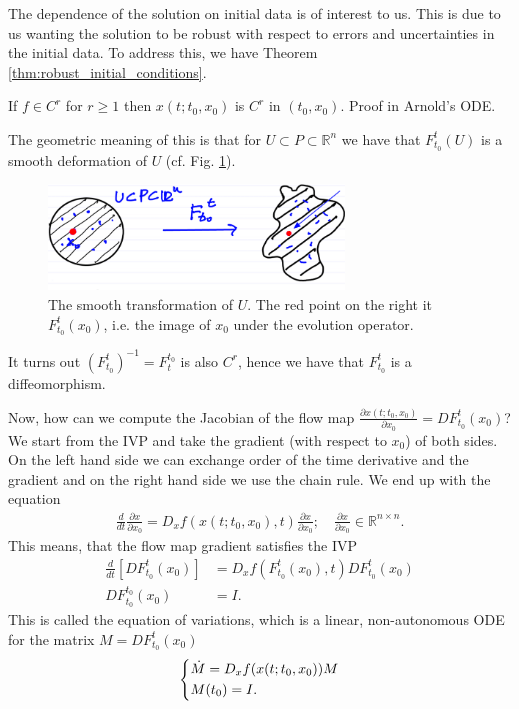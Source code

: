 The dependence of the solution on initial data is of interest to us. This is due to us wanting the solution to be robust with respect to errors and uncertainties in the initial data. To address this, we have Theorem \ref{thm:robust_initial_conditions}.
\begin{theorem}[]
	If $f \in C^r$ for $r\geq 1$ then $ {x}(t; t_0,  {x}_0)$ is $C^r$ in $(t_0,  {x}_0)$. Proof in Arnold's ODE.
	\label{thm:robust_initial_conditions}
\end{theorem}

The geometric meaning of this is that for $U \subset P \subset \mathbb{R}^{n}$ we have that $F_{t_0}^{t}(U)$ is a smooth deformation of $U$ (cf. Fig. \ref{fig:deformation}).
\begin{figure}[h!]
	\centering
	\includegraphics[width=0.7\textwidth]{figures/ch1/7smooth_transform.png}
	\caption{The smooth transformation of $U$. The red point on the right it $F _{t_0}^t( {x}_0)$, i.e. the image of $ {x}_0$ under the evolution operator.}
	\label{fig:deformation}
\end{figure}
It turns out $\left(F_{t_0}^{t}\right)^{-1} = F_{t}^{t_0}$ is also $C^r$, hence we have that $F_{t_0}^{t}$ is a diffeomorphism. 

Now, how can we compute the Jacobian of the flow map $\frac{\partial  {x}(t; t_0,  {x}_0)}{ \partial  {x}_0} = DF _{t_0}^{t}( {x}_0)$? We start from the IVP and take the gradient (with respect to $x_0$) of both sides. On the left hand side we can exchange order of the time derivative and the gradient and on the right hand side we use the chain rule. We end up with the equation
\begin{align}
	\frac{d}{dt}\frac{\partial  {x}}{\partial  {x}_0} = D_ {x} f( {x}(t; t_0,  {x}_0), t) \frac{\partial  {x}}{\partial  {x}_0}; \quad \frac{\partial x}{\partial x_0} \in \mathbb{R}^{n \times n}.
\end{align}
This means, that the flow map gradient satisfies the IVP
\begin{align}
	\frac{d}{dt}\left[ DF_{t_0}^{t}( {x}_0)\right] &= D_{ {x}}f(F_{t_0}^{t}( {x}_0), t) DF_{t_0}^{t}( {x}_0) \\
	DF_{t_0}^{t_0}( {x}_0) &= I.
\end{align}
This is called the equation of variations, which is a linear, non-autonomous ODE for the matrix $M = DF_{t_0}^{t}(x_0)$
\begin{align}
	\begin{dcases}
		\dot{M} = D_ {x} f( {x}(t; t_0,  {x}_0)) M \\ M(t_0) = I.
	\end{dcases}
\end{align}


